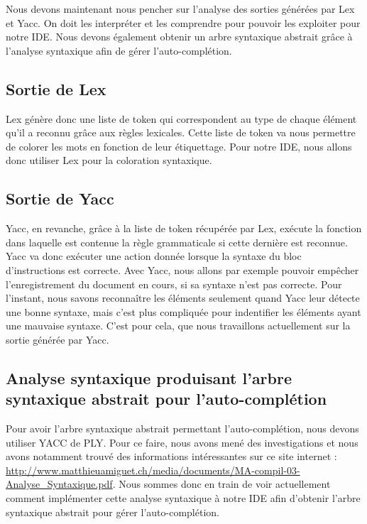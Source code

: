 \documentclass[a4paper,12pt]{article}
\begin{document}
	Nous devons maintenant nous pencher sur l'analyse des sorties générées par Lex et Yacc. On doit les interpréter et les comprendre pour pouvoir les exploiter pour notre IDE. Nous devons également obtenir un arbre syntaxique abstrait grâce à l'analyse syntaxique afin de gérer l'auto-complétion.


	\subsection{Sortie de Lex}

		Lex génère donc une liste de token qui correspondent au type de chaque élément qu'il a reconnu grâce aux règles lexicales. Cette liste de token va nous permettre de colorer les mots en fonction de leur étiquettage. Pour notre IDE, nous allons donc utiliser Lex pour la coloration syntaxique. 
	
	\subsection{Sortie de Yacc}

		Yacc, en revanche, grâce à la liste de token récupérée par Lex, exécute la fonction dans laquelle est contenue la règle grammaticale si cette dernière est reconnue. Yacc va donc exécuter une action donnée lorsque la syntaxe du bloc d'instructions est correcte. Avec Yacc, nous allons par exemple pouvoir empêcher l'enregistrement du document en cours, si sa syntaxe n'est pas correcte.
		Pour l'instant, nous savons reconnaître les éléments seulement quand Yacc leur détecte une bonne syntaxe, mais c'est plus compliquée pour indentifier les éléments ayant une mauvaise syntaxe. C'est pour cela, que nous travaillons actuellement sur la sortie générée par Yacc. 
		
	\subsection{Analyse syntaxique produisant l'arbre syntaxique abstrait pour l'auto-complétion}

		Pour avoir l'arbre syntaxique abstrait permettant l'auto-complétion, nous devons utiliser YACC de PLY. Pour ce faire, nous avons mené des investigations et nous avons notamment trouvé des informations intéressantes sur ce site internet : \url{http://www.matthieuamiguet.ch/media/documents/MA-compil-03-Analyse_Syntaxique.pdf}. Nous sommes donc en train de voir actuellement comment implémenter cette analyse syntaxique à notre IDE afin d'obtenir l'arbre syntaxique abstrait pour gérer l'auto-complétion.
			
\end{document}
